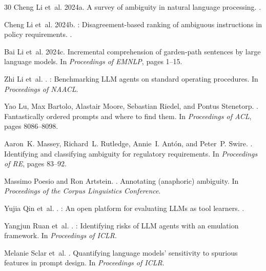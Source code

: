 \documentclass[11pt,a4paper]{article}
\begin{document}
\begin{thebibliography}{30}
Cheng Li et~al.
\newblock 2024a.
\newblock A survey of ambiguity in natural language processing.
.

Cheng Li et~al.
\newblock 2024b.
: Disagreement-based ranking of ambiguous instructions in policy requirements.
.

Bai Li et~al.
\newblock 2024c.
\newblock Incremental comprehension of garden-path sentences by large language models.
\newblock In {\em Proceedings of EMNLP}, pages 1--15.

Zhi Li et~al.
.
: Benchmarking {LLM} agents on standard operating procedures.
\newblock In {\em Proceedings of NAACL}.

Yao Lu, Max Bartolo, Alastair Moore, Sebastian Riedel, and Pontus Stenetorp.
.
\newblock Fantastically ordered prompts and where to find them.
\newblock In {\em Proceedings of ACL}, pages 8086--8098.

Aaron~K. Massey, Richard~L. Rutledge, Annie~I. Ant\'{o}n, and Peter~P. Swire.
.
\newblock Identifying and classifying ambiguity for regulatory requirements.
\newblock In {\em Proceedings of RE}, pages 83--92.

Massimo Poesio and Ron Artstein.
.
\newblock Annotating (anaphoric) ambiguity.
\newblock In {\em Proceedings of the Corpus Linguistics Conference}.

Yujia Qin et~al.
.
: An open platform for evaluating {LLMs} as tool learners.
.

Yangjun Ruan et~al.
.
: Identifying risks of {LLM} agents with an emulation framework.
\newblock In {\em Proceedings of ICLR}.

Melanie Sclar et~al.
.
\newblock Quantifying language models' sensitivity to spurious features in prompt design.
\newblock In {\em Proceedings of ICLR}.


\end{thebibliography}
\end{document}
